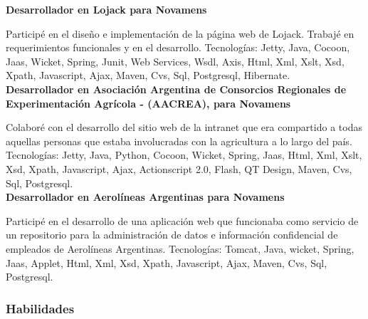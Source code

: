 \documentclass[a4paper,11pt]{article}
\begin{document}
\noindent \textbf{Desarrollador en Lojack para Novamens}

\noindent Participé en el diseño e implementación de la página web de Lojack.
Trabajé en requerimientos funcionales y en el desarrollo.  Tecnologías: Jetty,
Java, Cocoon, Jaas, Wicket, Spring, Junit, Web Services, Wsdl, Axis, Html, Xml,
Xslt, Xsd, Xpath, Javascript, Ajax, Maven, Cvs, Sql, Postgresql, Hibernate. \\

\noindent \textbf{Desarrollador en Asociación Argentina de Consorcios
Regionales de Experimentación Agrícola - (AACREA), para Novamens}

\noindent Colaboré con el desarrollo del sitio web de la intranet que era
compartido a todas aquellas personas que estaba involucradas con la agricultura
a lo largo del país.  Tecnologías: Jetty, Java, Python, Cocoon, Wicket, Spring,
Jaas, Html, Xml, Xslt, Xsd, Xpath, Javascript, Ajax, Actionscript 2.0, Flash,
QT Design, Maven, Cvs, Sql, Postgresql. \\

\noindent \textbf{Desarrollador en Aerolíneas Argentinas para Novamens}

\noindent Participé en el desarrollo de una aplicación web que funcionaba como
servicio de un repositorio para la administración de datos e información
confidencial de empleados de Aerolíneas Argentinas.  Tecnologías: Tomcat, Java,
wicket, Spring, Jaas, Applet, Html, Xml, Xsd, Xpath, Javascript, Ajax, Maven,
Cvs, Sql, Postgresql. \\

\subsubsection{Habilidades}
\end{document}
